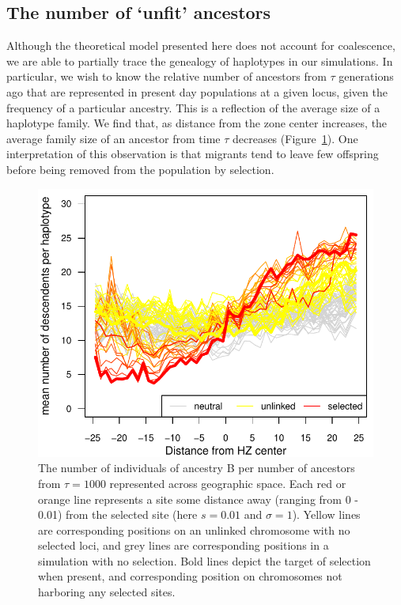 \documentclass[12pt]{article}
\begin{document}
\subsection*{The number of `unfit' ancestors}
Although the theoretical model presented here does not account for coalescence, we are able to partially trace the genealogy of haplotypes in our simulations. In particular, we wish to know the relative number of ancestors from $\tau$ generations ago that are represented in present day populations at a given locus, given the frequency of a particular ancestry. This is a reflection of the average size of a haplotype family. We find that, as distance from the zone center increases, the average family size of an ancestor from time $\tau$ decreases (Figure~\ref{Fig:family_size}). One interpretation of this observation is that migrants tend to leave few offspring before being removed from the population by selection. 

\begin{figure}
\includegraphics{figs/number_of_ancestors_tau1000}
\caption{The number of individuals of ancestry B per number of ancestors from $\tau=1000$ represented across geographic space. Each red or orange line represents a site some distance away (ranging from 0 - 0.01) from the selected site (here $s=0.01$ and $\sigma=1$). Yellow lines are corresponding positions on an unlinked chromosome with no selected loci, and grey lines are corresponding positions in a simulation with no selection.  Bold lines depict the target of selection when present, and corresponding position on chromosomes not harboring any selected sites.}\label{Fig:family_size}
\end{figure}
\end{document}
